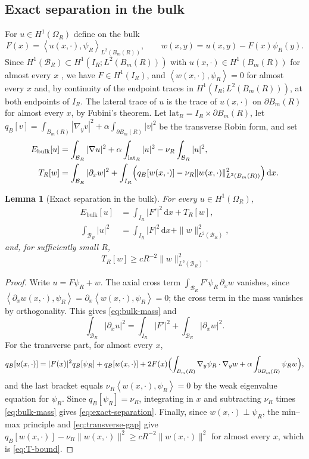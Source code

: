 \documentclass[11pt,a4paper]{article}
\numberwithin{equation}{section}
\theoremstyle{paperplain}
\newtheorem{lemma}[theorem]{Lemma}
\theoremstyle{remark}
\newcommand{\B}{\mathcal{B}}
\newcommand{\dd}{\,\mathrm d}
\newcommand{\ip}[2]{\left\langle#1,#2\right\rangle}
\begin{document}
\subsection{Exact separation in the bulk}
For $u\in H^1(\Omega_R)$ define on the bulk
\begin{equation}\label{eq:bulk-projection}
 F(x)=\ip{u(x,\cdot)}{\psi_R}_{L^2(B_m(R))},\qquad
 w(x,y)=u(x,y)-F(x)\psi_R(y).
\end{equation}
Since $H^1(\B_R)\subset H^1(I_R;L^2(B_m(R)))$ with $u(x,\cdot)\in
H^1(B_m(R))$ for almost every $x$ \cite[Section~5.9]{EvansPDE}, we have
$F\in H^1(I_R)$, and $\ip{w(x,\cdot)}{\psi_R}=0$ for almost every $x$ and,
by continuity of the endpoint traces in $H^1(I_R;L^2(B_m(R)))$, at both
endpoints of $I_R$. The lateral trace of $u$ is the trace of $u(x,\cdot)$ on
$\partial B_m(R)$ for almost every $x$, by Fubini's theorem. Let $\mathrm{lat}_R=I_R\times\partial B_m(R)$, let
$q_B[v]=\int_{B_m(R)}|\nabla_yv|^2+\alpha\int_{\partial B_m(R)}|v|^2$ be the
transverse Robin form, and set
\begin{align}
 E_{\mathrm{bulk}}[u]&=\int_{\B_R}|\nabla u|^2
  +\alpha\int_{\mathrm{lat}_R}|u|^2-\nu_R\int_{\B_R}|u|^2,\notag\\
 T_R[w]&=\int_{\B_R}|\partial_xw|^2
 +\int_{I_R}\Bigl(q_B[w(x,\cdot)]-\nu_R\|w(x,\cdot)\|^2_{L^2(B_m(R))}\Bigr)\dd x.\notag
\end{align}

\begin{lemma}[Exact separation in the bulk]\label{lem:bulk}
For every $u\in H^1(\Omega_R)$,
\begin{align}
 E_{\mathrm{bulk}}[u]&=\int_{I_R}|F'|^2\dd x+T_R[w],\label{eq:exact-separation}\\
 \int_{\B_R}|u|^2&=\int_{I_R}|F|^2\dd x+\|w\|_{L^2(\B_R)}^2,\label{eq:bulk-mass}
\end{align}
and, for sufficiently small $R$,
\begin{equation}\label{eq:T-bound}
 T_R[w]\ge cR^{-2}\|w\|_{L^2(\B_R)}^2.
\end{equation}
\end{lemma}

\begin{proof}
Write $u=F\psi_R+w$. The axial cross term
$\int_{\B_R}F'\psi_R\,\partial_xw$ vanishes, since
$\ip{\partial_xw(x,\cdot)}{\psi_R}=\partial_x\ip{w(x,\cdot)}{\psi_R}=0$;
the cross term in the mass vanishes by orthogonality. This gives
\eqref{eq:bulk-mass} and
\[
 \int_{\B_R}|\partial_xu|^2=\int_{I_R}|F'|^2+\int_{\B_R}|\partial_xw|^2 .
\]
For the transverse part, for almost every $x$,
\[
 q_B[u(x,\cdot)]=|F(x)|^2q_B[\psi_R]+q_B[w(x,\cdot)]
 +2F(x)\Bigl(\int_{B_m(R)}\nabla_y\psi_R\cdot\nabla_yw+\alpha\int_{\partial B_m(R)}\psi_Rw\Bigr),
\]
and the last bracket equals $\nu_R\ip{w(x,\cdot)}{\psi_R}=0$ by the weak
eigenvalue equation for $\psi_R$. Since $q_B[\psi_R]=\nu_R$, integrating in
$x$ and subtracting $\nu_R$ times \eqref{eq:bulk-mass} gives
\eqref{eq:exact-separation}. Finally, since $w(x,\cdot)\perp\psi_R$, the
min--max principle and \eqref{eq:transverse-gap} give
$q_B[w(x,\cdot)]-\nu_R\|w(x,\cdot)\|^2\ge cR^{-2}\|w(x,\cdot)\|^2$ for
almost every $x$, which is \eqref{eq:T-bound}.
\end{proof}
\end{document}
